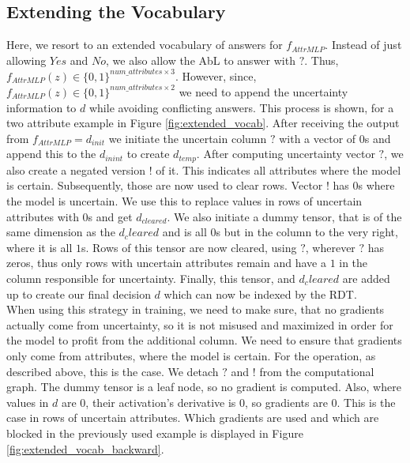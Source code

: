 \documentclass[a4paper,cleardoubleempty,BCOR1cm, 11pt]{report}
\begin{document}
\subsection{Extending the Vocabulary}
Here, we resort to an extended vocabulary of answers for $f_{AttrMLP}$. Instead of just allowing $Yes$ and $No$, we also allow the AbL to answer with $?$. Thus, $f_{AttrMLP}(z) \in \lbrace 0,1 \rbrace^{num\_attributes \times 3}$. However, since, $f_{AttrMLP}(z) \in \lbrace 0,1 \rbrace^{num\_attributes \times 2}$ we need to append the uncertainty information to $d$ while avoiding conflicting answers. This process is shown, for a two attribute example in Figure \ref{fig:extended_vocab}. After receiving the output from $f_{AttrMLP} = d_{init}$ we initiate the uncertain column $?$ with a vector of $0$s and append this to the $d_{inint}$ to create $d_{temp}$. After computing uncertainty vector $?$, we also create a negated version $!$ of it. This indicates all attributes where the model is certain. Subsequently, those are now used to clear rows. Vector $!$ has $0$s where the model is uncertain. We use this to replace values in rows of uncertain attributes with $0$s and get $d_{cleared}$. We also initiate a dummy tensor, that is of the same dimension as the $d_cleared$ and is all $0$s but in the column to the very right, where it is all $1$s. Rows of this tensor are now cleared, using $?$, wherever $?$ has zeros, thus only rows with uncertain attributes remain and have a $1$ in the column responsible for uncertainty. Finally, this tensor, and $d_cleared$ are added up to create our final decision $d$ which can now be indexed by the RDT.\\
When using this strategy in training, we need to make sure, that no gradients actually come from uncertainty, so it is not misused and maximized in order for the model to profit from the additional column. We need to ensure that gradients only come from attributes, where the model is certain. For the operation, as described above, this is the case. We detach $?$ and $!$ from the computational graph. The dummy tensor is a leaf node, so no gradient is computed. Also, where values  in $d$ are $0$, their activation's derivative is $0$, so gradients are $0$. This is the case in rows of uncertain attributes. Which gradients are used and which are blocked in the previously used example is displayed in Figure \ref{fig:extended_vocab_backward}.
\end{document}
